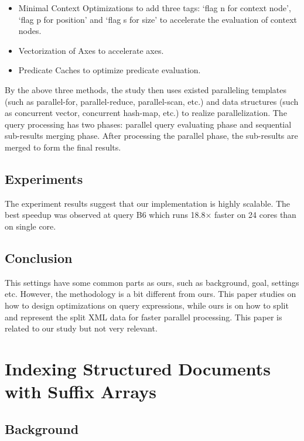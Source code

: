 \documentclass{paper}
\begin{document}
	\begin{itemize}
		\item Minimal Context Optimizations to add three tags: `flag n for context 
		node', `flag p for position' and `flag s for size' to accelerate the 
		evaluation of context nodes.
		\item Vectorization of Axes to accelerate axes. 
		\item Predicate Caches to optimize predicate evaluation.
	\end{itemize}
	
	By the above three methods, the study then uses existed paralleling 
	templates (such as parallel-for, parallel-reduce, parallel-scan, etc.) 
	and data structures (such as concurrent vector, concurrent hash-map, etc.) 
	to realize parallelization. The query processing has two phases:
	parallel query evaluating phase and sequential sub-results merging phase. 
	After processing the parallel phase, the sub-results are merged to 
	form the final results.
	
	
	\subsection{Experiments}
	
	The experiment results suggest that our implementation is highly
	scalable. The best speedup was observed at query B6 which runs 18.8×
	faster on 24 cores than on single core. 
	
	\subsection{Conclusion}
	
	This settings have some common parts as ours, such as background, 
	goal, settings etc. However, the methodology is	a bit different from ours. 
	This paper studies on how to design optimizations
	on query expressions, while ours is on how to split and represent 
	the split XML data for faster parallel processing. This paper is related 
	to our study but not very relevant.
	
	
	\section{Indexing Structured Documents with Suffix Arrays}
	
	\subsection{Background}
	
\end{document}
